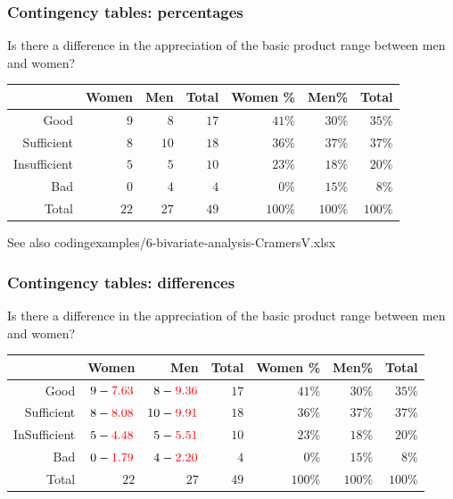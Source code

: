 \documentclass{beamer}
\begin{document}
\begin{frame}
  \frametitle{Contingency tables: percentages}
  Is there a difference in the appreciation of the basic product range between men and women?
  \begin{adjustwidth}{-1.5em}{-1.5em}
    \begin{table}[h] \centering
      \begin{tabular}{@{}rrrrrrr@{}}
        \toprule
                     & Women &  Men & Total & Women \% &   Men\% &   Total \\ \midrule
                Good &   $9$ &  $8$ &  $17$ &   $41$\% &  $30$\% &  $35$\% \\
          Sufficient &   $8$ & $10$ &  $18$ &   $36$\% &  $37$\% &  $37$\% \\
        Insufficient &   $5$ &  $5$ &  $10$ &   $23$\% &  $18$\% &  $20$\% \\
                 Bad &   $0$ &  $4$ &   $4$ &    $0$\% &  $15$\% &   $8$\% \\
               Total &  $22$ & $27$ &  $49$ &  $100$\% & $100$\% & $100$\% \\ \bottomrule
      \end{tabular}
    \end{table}
  \end{adjustwidth}
  \vfill
  See also codingexamples/6-bivariate-analysis-CramersV.xlsx
\end{frame}

\begin{frame}
  \frametitle{Contingency tables: differences}
  Is there a difference in the appreciation of the basic product range between men and women?
  \begin{adjustwidth}{-1.5em}{-1.5em}
    \begin{table}[h] \centering
      \begin{tabular}{@{}rrrrrrr@{}}
        \toprule
                     &                       Women &                          Men & Total & Women \% &   Men\% &   Total \\ \midrule
                Good &  $9 -\textcolor{red}{7.63}$ &  $8 - \textcolor{red}{9.36}$ &  $17$ &   $41$\% &  $30$\% &  $35$\% \\
          Sufficient & $8 - \textcolor{red}{8.08}$ & $10 - \textcolor{red}{9.91}$ &  $18$ &   $36$\% &  $37$\% &  $37$\% \\
        InSufficient & $5 - \textcolor{red}{4.48}$ &  $5 - \textcolor{red}{5.51}$ &  $10$ &   $23$\% &  $18$\% &  $20$\% \\
                 Bad & $0 - \textcolor{red}{1.79}$ &  $4 - \textcolor{red}{2.20}$ &   $4$ &    $0$\% &  $15$\% &   $8$\% \\
               Total &                        $22$ &                         $27$ &  $49$ &  $100$\% & $100$\% & $100$\% \\ \bottomrule
      \end{tabular}
    \end{table}
  \end{adjustwidth}
\end{frame}
\end{document}
